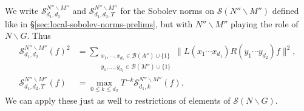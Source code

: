 \documentclass[reqno]{amsart}
\theoremstyle{plain} \newtheorem{theorem} {Theorem}
\theoremstyle{definition} \newtheorem{definition} [theorem] {Definition}
\theoremstyle{itplain} %
\numberwithin{equation}{section}
\numberwithin{theorem}{section}
\renewcommand{\leq}{\leqslant}
\begin{document}
We write $\mathcal{S}_{d_1,d_2}^{N'' \backslash M''}$ and $\mathcal{S}_{d_1,d_2,T}^{N'' \backslash M''}$ for the Sobolev norms on $\mathcal{S}(N'' \backslash M'')$ defined like in \S\ref{sec:local-sobolev-norms-prelims}, but with $N'' \backslash M''$ playing the role of $N \backslash G$.  Thus
\begin{align*}
  \mathcal{S}_{d_1,d_2}^{N'' \backslash M''}(f)^2
  &=
  \sum _{
    \substack{
      x_1, \dotsb, x_{d_1} \in \mathcal{B}(A'') \cup \{1\}  \\
       y_1, \dotsc, y _{d _2 } \in \mathcal{B}(M'') \cup \{1\}
    }
  }
  \| L(x_1 \dotsb x_{d_1}) R(y_1 \dotsb y_{d_2}) f \|^2, \\
  \mathcal{S}_{d_1,d_2,T}^{N'' \backslash M''}(f)
  &=
  \max_{0 \leq k \leq d_2}
  T^{-k}
  \mathcal{S}_{d_1,k}^{N'' \backslash M''}(f).
\end{align*}
We can apply these just as well to restrictions of elements of $\mathcal{S}(N \backslash G)$.
\end{document}
